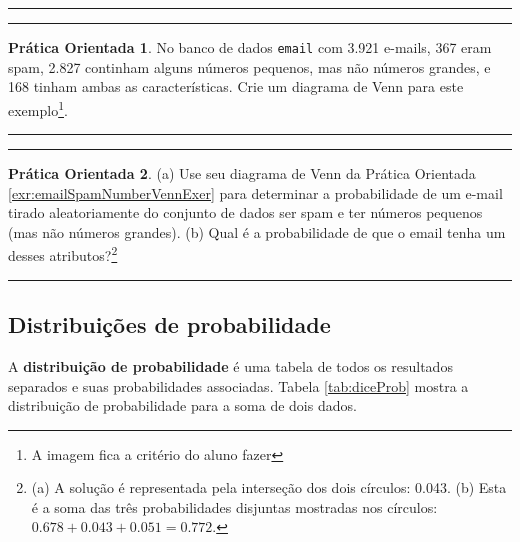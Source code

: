\documentclass[
]{book}
\theoremstyle{definition}
\theoremstyle{definition}
\theoremstyle{definition}
\newtheorem{exercise}{Prática Orientada}[chapter]
\theoremstyle{definition}
\theoremstyle{remark}
\begin{document}
\begin{center}\rule{0.5\linewidth}{0.5pt}\end{center}

\begin{center}\rule{0.5\linewidth}{0.5pt}\end{center}

\begin{exercise}
\protect\hypertarget{exr:emailSpamNumberVennExer}{}{\label{exr:emailSpamNumberVennExer} }No banco de dados \texttt{email} com 3.921 e-mails, 367 eram spam, 2.827 continham alguns números pequenos, mas não números grandes, e 168 tinham ambas as características. Crie um diagrama de Venn para este exemplo\footnote{A imagem fica a critério do aluno fazer}.
\end{exercise}

\begin{center}\rule{0.5\linewidth}{0.5pt}\end{center}

\begin{center}\rule{0.5\linewidth}{0.5pt}\end{center}

\begin{exercise}
\protect\hypertarget{exr:unnamed-chunk-50}{}{\label{exr:unnamed-chunk-50} }(a) Use seu diagrama de Venn da Prática Orientada \ref{exr:emailSpamNumberVennExer} para determinar a probabilidade de um e-mail tirado aleatoriamente do conjunto de dados ser spam e ter números pequenos (mas não números grandes).
(b) Qual é a probabilidade de que o email tenha um desses atributos?\footnote{(a) A solução é representada pela interseção dos dois círculos: 0.043. (b) Esta é a soma das três probabilidades disjuntas mostradas nos círculos: \(0.678 + 0.043 + 0.051 = 0.772\).}
\end{exercise}

\begin{center}\rule{0.5\linewidth}{0.5pt}\end{center}

\hypertarget{probabilityDistribution}{%
\subsection{Distribuições de probabilidade}\label{probabilityDistribution}}

A \textbf{distribuição de probabilidade} é uma tabela de todos os resultados separados e suas probabilidades associadas. Tabela \ref{tab:diceProb} mostra a distribuição de probabilidade para a soma de dois dados.
\end{document}
